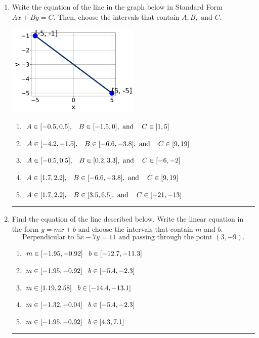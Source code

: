 \documentclass[14pt]{extbook}
\newcommand{\litem}[1]{\item#1\hspace*{-1cm}\rule{\textwidth}{0.4pt}}
\begin{document}
\begin{enumerate}
\litem{
Write the equation of the line in the graph below in Standard Form $Ax+By=C$. Then, choose the intervals that contain $A, B, \text{ and } C$.
\begin{center}
    \includegraphics[width=0.5\textwidth]{../Figures/linearGraphToStandardC.png}
\end{center}
\begin{enumerate}[label=\Alph*.]
\item \( A \in [-0.5, 0.5], \hspace{3mm} B \in [-1.5, 0], \text{ and } \hspace{3mm} C \in [1, 5] \)
\item \( A \in [-4.2, -1.5], \hspace{3mm} B \in [-6.6, -3.8], \text{ and } \hspace{3mm} C \in [9, 19] \)
\item \( A \in [-0.5, 0.5], \hspace{3mm} B \in [0.2, 3.3], \text{ and } \hspace{3mm} C \in [-6, -2] \)
\item \( A \in [1.7, 2.2], \hspace{3mm} B \in [-6.6, -3.8], \text{ and } \hspace{3mm} C \in [9, 19] \)
\item \( A \in [1.7, 2.2], \hspace{3mm} B \in [3.5, 6.5], \text{ and } \hspace{3mm} C \in [-21, -13] \)

\end{enumerate} }
\litem{
Find the equation of the line described below. Write the linear equation in the form $ y=mx+b $ and choose the intervals that contain $m$ and $b$.\[ \text{Perpendicular to } 5 x - 7 y = 11 \text{ and passing through the point } (3, -9). \]\begin{enumerate}[label=\Alph*.]
\item \( m \in [-1.95, -0.92] \hspace*{3mm} b \in [-12.7, -11.3] \)
\item \( m \in [-1.95, -0.92] \hspace*{3mm} b \in [-5.4, -2.3] \)
\item \( m \in [1.19, 2.58] \hspace*{3mm} b \in [-14.4, -13.1] \)
\item \( m \in [-1.32, -0.04] \hspace*{3mm} b \in [-5.4, -2.3] \)
\item \( m \in [-1.95, -0.92] \hspace*{3mm} b \in [4.3, 7.1] \)


\end{enumerate}}
\end{enumerate}
\end{document}
